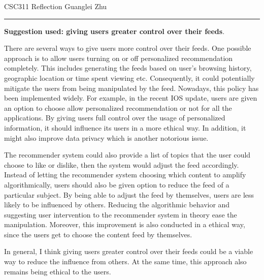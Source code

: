 \documentclass[12pt]{article}
\begin{document}
    CSC311 Reflection \hfill Guanglei Zhu \smallskip
    \hrule \bigskip
    \textbf{Suggestion used: giving users greater control over their feeds}. \bigskip \par
    There are several ways to give users more control over their feeds. One possible approach is to allow users 
    turning on or off personalized recommendation completely. This includes generating the feeds based on user's browsing history, 
    geographic location or time spent viewing etc. Consequently, it could potentially mitigate the users from being 
    manipulated by the feed. Nowadays, this policy has been implemented widely. For example, in the recent IOS update, 
    users are given an option to choose allow personalized recommendation or not for all the applications. By giving users full control over 
    the usage of personalized information, it should influence its users in a more ethical way. In addition, it might also 
    improve data privacy which is another notorious issue.\par
    The recommender system could also provide a list of topics that the user could choose to like or dislike, then the system would
    adjust the feed accordingly. Instead of letting the recommender system choosing which content to amplify algorithmically, users should
    also be given option to reduce the feed of a particular subject. By being able to adjust the feed by themselves, users are less
    likely to be influenced by others. Reducing the algorithmic behavior and suggesting user intervention to the recommender system 
    in theory ease the manipulation. Moreover, this improvement is also conducted in a ethical way, since the users get to choose 
    the content feed by themselves. \par 
    In general, I think giving users greater control over their feeds could be a viable way to reduce the influence from others. At the
    same time, this approach also remains being ethical to the users.
\end{document}
